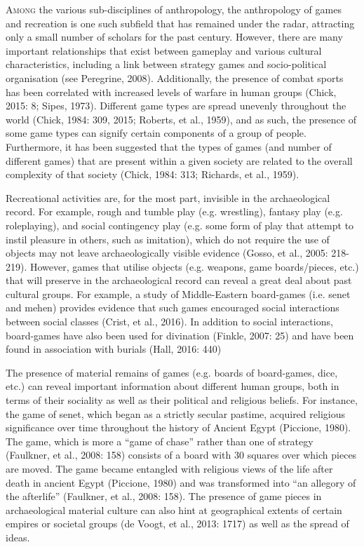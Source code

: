 \documentclass[%
	]{ijsra}
\begin{document}
\IJSRAopening%
\lettrine{A}{mong} the various sub-disciplines of anthropology, the anthropology of games and recreation is one such subfield that has remained under the radar, attracting only a small number of scholars for the past century. However, there are many important relationships that exist between gameplay and various cultural characteristics, including a link between strategy games and socio-political organisation (see Peregrine, 2008). Additionally, the presence of combat sports has been correlated with increased levels of warfare in human groups (Chick, 2015: 8; Sipes, 1973). Different game types are spread unevenly throughout the world (Chick, 1984: 309, 2015; Roberts, et al., 1959), and as such, the presence of some game types can signify certain components of a group of people. Furthermore, it has been suggested that the types of games (and number of different games) that are present within a given society are related to the overall complexity of that society (Chick, 1984: 313; Richards, et al., 1959).

Recreational activities are, for the most part, invisible in the archaeological record. For example, rough and tumble play (e.g. wrestling), fantasy play (e.g. roleplaying), and social contingency play (e.g. some form of play that attempt to instil pleasure in others, such as imitation), which do not require the use of objects may not leave archaeologically visible evidence (Gosso, et al., 2005: 218-219). However, games that utilise objects (e.g. weapons, game boards/pieces, etc.) that will preserve in the archaeological record can reveal a great deal about past cultural groups. For example, a study of Middle-Eastern board-games (i.e. senet and mehen) provides evidence that such games encouraged social interactions between social classes (Crist, et al., 2016). In addition to social interactions, board-games have also been used for divination (Finkle, 2007: 25) and have been found in association with burials (Hall, 2016: 440)

The presence of material remains of games (e.g. boards of board-games, dice, etc.) can reveal important information about different human groups, both in terms of their sociality as well as their political and religious beliefs. For instance, the game of senet, which began as a strictly secular pastime, acquired religious significance over time throughout the history of Ancient Egypt (Piccione, 1980).  The game, which is more a “game of chase” rather than one of strategy (Faulkner, et al., 2008: 158) consists of a board with 30 squares over which pieces are moved. The game became entangled with religious views of the life after death in ancient Egypt (Piccione, 1980) and was transformed into “an allegory of the afterlife” (Faulkner, et al., 2008: 158). The presence of game pieces in archaeological material culture can also hint at geographical extents of certain empires or societal groups (de Voogt, et al., 2013: 1717) as well as the spread of ideas.
\end{document}
